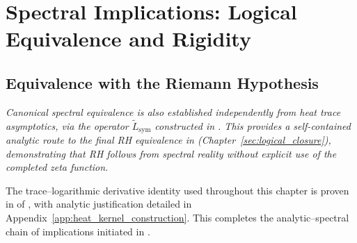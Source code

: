 \section{Spectral Implications: Logical Equivalence and Rigidity}
\label{sec:spectral_implications}



\subsection{Equivalence with the Riemann Hypothesis}
\label{sec:rh_equivalence}







\medskip
\noindent
\emph{Canonical spectral equivalence is also established independently from heat trace asymptotics, via the operator \(\tilde{L}_{\mathrm{sym}}\) constructed in . This provides a self-contained analytic route to the final RH equivalence in  (Chapter~\ref{sec:logical_closure}), demonstrating that RH follows from spectral reality without explicit use of the completed zeta function.}












\medskip
\noindent
The trace–logarithmic derivative identity used throughout this chapter is proven in  of , with analytic justification detailed in Appendix~\ref{app:heat_kernel_construction}. This completes the analytic–spectral chain of implications initiated in .

